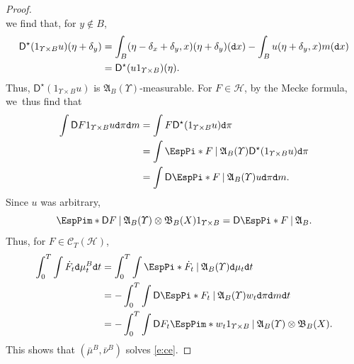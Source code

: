 \documentclass[10pt]{amsart}
\theoremstyle{definition}
\theoremstyle{remark}
\DeclarePairedDelimiter{\paren}{\lparen}{\rparen}
\newcommand{\given}[1][]{%
\nonscript\:#1\vert
\allowbreak
\nonscript\:
\mathopen{}}
\begin{document}
\begin{proof}
\begin{equation*}
\end{equation*}
we find that, for $y \not\in B$,
\begin{align*}
\mathsf{D}^{\star}( 1_{\varUpsilon \times B} u)(\eta +\delta_{y}) &= \int_{B}(\eta - \delta_{x} + \delta_{y}, x) (\eta + \delta_{y})(\mathtt{d} x) - \int_{B} u(\eta+\delta_{y}, x) m(\mathtt{d} x)\\
&= \mathsf{D}^{\star} \paren*{ u 1_{\varUpsilon \times B} }(\eta).
\end{align*}
Thus, $\mathsf{D}^{\star}(1_{\varUpsilon \times B} u)$ is $\mathfrak{A}_{B}(\varUpsilon)$-measurable.
For $F \in \mathscr{H}$, by the Mecke formula, we~thus find that
\begin{align*}
\int \mathsf{D} F 1_{\varUpsilon \times B} u \mathtt{d} \pi \mathtt{d} m &= \int F \mathsf{D}^{\star} \paren*{ 1_{\varUpsilon \times B} u } \mathtt{d} \pi \\
&= \int \EspPi*{ F \given \mathfrak{A}_{B}(\varUpsilon) } \mathsf{D}^{\star} \paren*{ 1_{\varUpsilon \times B} u } \mathtt{d} \pi \\
&= \int \mathsf{D} \EspPi*{ F \given \mathfrak{A}_{B}(\varUpsilon) } u \mathtt{d} \pi \mathtt{d} m.
\end{align*}
Since $u$ was arbitrary,
\begin{equation*}
\EspPim*{ \mathsf{D} F \given \mathfrak{A}_{B}(\varUpsilon) \otimes \mathfrak{B}_{B}(X) } 1_{\varUpsilon \times B} = \mathsf{D} \EspPi*{ F \given \mathfrak{A}_{B} }.
\end{equation*}
Thus, for $F \in \mathscr{C}_{T}(\mathscr{H})$,
\begin{align*}
\int_{0}^{T} \int \dot{F}_{t} \mathtt{d} \mu^{B}_{t} \mathtt{d} t &= \int_{0}^{T} \int \EspPi*{ \dot{F}_{t} \given \mathfrak{A}_{B}(\varUpsilon) } \mathtt{d} \mu_{t} \mathtt{d} t \\
&= - \int_{0}^{T} \int \mathsf{D} \EspPi*{ F_{t} \given \mathfrak{A}_{B}(\varUpsilon) } w_{t} \mathtt{d} \pi \mathtt{d} m \mathtt{d} t \\
&= - \int_{0}^{T} \int \mathsf{D} F_{t} \EspPim*{ w_{t} 1_{\varUpsilon \times B} \given \mathfrak{A}_{B}(\varUpsilon) \otimes \mathfrak{B}_{B}(X) }.
\end{align*}
This shows that $(\bar{\mu}^{B}, \bar{\nu}^{B})$ solves \cref{e:ce}.


\end{proof}
\end{document}
